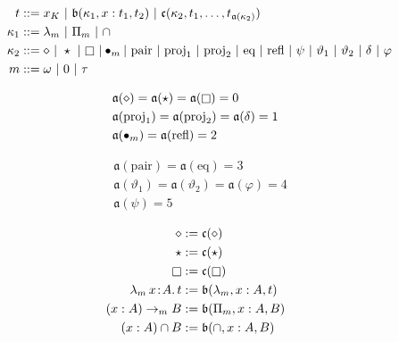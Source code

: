 
\begin{figure}
    \centering
    \begin{align*}
        t &::= x_K\ |\ \mathfrak{b}(\kappa_1, x : t_1, t_2)\ |\ \mathfrak{c}(\kappa_2, t_1, \ldots, t_{\mathfrak{a}(\kappa_2)}) \\
        \kappa_1 &::= \lambda_m\ |\ \Pi_m\ |\ \cap \\
        \kappa_2 &::=\diamond\ |\ \star\ |\ \kind\ | \bullet_m |\ \text{pair}\ |\ \text{proj}_1\ |\ \text{proj}_2\ |\ \text{eq}\ |\ \text{refl}\ |\ \psi\ |\ \vartheta_1\ |\ \vartheta_2\ |\ \delta\ |\ \varphi  \\
        m &::= \omega\ |\ 0\ |\ \tau
    \end{align*}
    \vspace{-.3in}
    \begin{minipage}{0.5\textwidth}
        \begin{align*}
            &\mathfrak{a}(\diamond) = \mathfrak{a}(\star) = \mathfrak{a}(\kind) = 0 \\
            &\mathfrak{a}(\text{proj}_1) = \mathfrak{a}(\text{proj}_2) = \mathfrak{a}(\delta) = 1 \\
            &\mathfrak{a}(\bullet_m) = \mathfrak{a}(\text{refl}) = 2
        \end{align*}
    \end{minipage}%
    \begin{minipage}{0.5\textwidth}
        \begin{align*}
            &\mathfrak{a}(\text{pair}) = \mathfrak{a}(\text{eq}) = 3 \\
            &\mathfrak{a}(\vartheta_1) = \mathfrak{a}(\vartheta_2) = \mathfrak{a}(\varphi) = 4 \\
            &\mathfrak{a}(\psi) = 5
        \end{align*}
    \end{minipage}
    \begin{minipage}{0.5\textwidth}
        \begin{align*}
            \diamond &:= \mathfrak{c}(\diamond) \\
            \star &:= \mathfrak{c}(\star) \\
            \kind &:= \mathfrak{c}(\kind) \\
            \abs{\lambda_m}{x}{A}{t} &:= \mathfrak{b}(\lambda_m, x : A, t) \\
            (x : A) \to_m B &:= \mathfrak{b}(\Pi_m, x : A, B) \\
            (x : A) \cap B &:= \mathfrak{b}(\cap, x : A, B) \\

\end{align*}
\end{minipage}
\end{figure}
